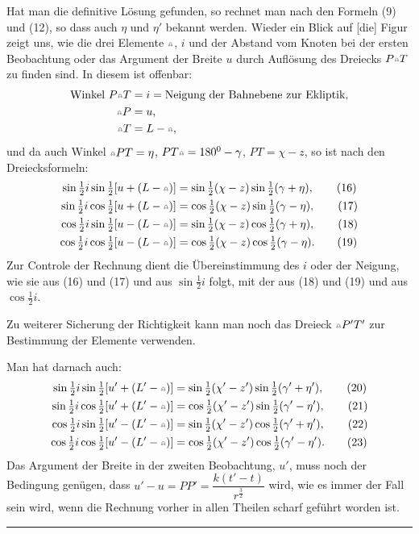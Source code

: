 Hat man die definitive Lösung gefunden, so rechnet man nach den Formeln (9) und (12), so dass auch $\eta$ und $\eta'$ bekannt werden. Wieder ein Blick auf [die] Figur zeigt uns, wie die drei Elemente $\AstNode$, $i$ und der Abstand vom Knoten bei der ersten Beobachtung oder das Argument der Breite $u$
\clearpage
{}
\noindent durch Auflösung des Dreiecks $P\AstNode T$ zu finden sind. In diesem ist offenbar:
\[
\begin{aligned}
\text{Winkel }P\AstNode T&=i=\text{Neigung der Bahnebene zur Ekliptik,}\\
\AstNode P&=u,\\
\AstNode T&=L-\AstNode,
\end{aligned}
\]
\noindent und da auch Winkel $\AstNode PT=\eta$, $PT\AstNode=180^0-\gamma$, $PT=\chi-z$, so ist nach den Dreiecksformeln:
\begin{align*}
\sin\tfrac12i\sin\tfrac12[u+(L-\AstNode)]&=\sin\tfrac12(\chi-z)\sin\tfrac12(\gamma+\eta),\tag*{(16)}\\
\sin\tfrac12i\cos\tfrac12[u+(L-\AstNode)]&=\cos\tfrac12(\chi-z)\sin\tfrac12(\gamma-\eta),\tag*{(17)}\\
\cos\tfrac12i\sin\tfrac12[u-(L-\AstNode)]&=\sin\tfrac12(\chi-z)\cos\tfrac12(\gamma+\eta),\tag*{(18)}\\
\cos\tfrac12i\cos\tfrac12[u-(L-\AstNode)]&=\cos\tfrac12(\chi-z)\cos\tfrac12(\gamma-\eta).\tag*{(19)}
\end{align*}
\noindent\hspace*{\parindent}Zur Controle der Rechnung dient die Übereinstimmung des $i$ oder der Neigung, wie sie aus (16) und (17) und aus $\sin\tfrac12i$ folgt, mit der aus (18) und (19) und aus $\cos\tfrac12i$.

Zu weiterer Sicherung der Richtigkeit kann man noch das Dreieck $\AstNode P'T'$ zur Bestimmung der Elemente verwenden.

Man hat darnach auch:
\begin{align*}
\sin\tfrac12i\sin\tfrac12[u'+(L'-\AstNode)]&=\sin\tfrac12(\chi'-z')\sin\tfrac12(\gamma'+\eta'),\tag*{(20)}\\
\sin\tfrac12i\cos\tfrac12[u'+(L'-\AstNode)]&=\cos\tfrac12(\chi'-z')\sin\tfrac12(\gamma'-\eta'),\tag*{(21)}\\
\cos\tfrac12i\sin\tfrac12[u'-(L'-\AstNode)]&=\sin\tfrac12(\chi'-z')\cos\tfrac12(\gamma'+\eta'),\tag*{(22)}\\
\cos\tfrac12i\cos\tfrac12[u'-(L'-\AstNode)]&=\cos\tfrac12(\chi'-z')\cos\tfrac12(\gamma'-\eta').\tag*{(23)}
\end{align*}
\noindent\hspace*{\parindent}Das Argument der Breite in der zweiten Beobachtung, $u'$, muss noch der Bedingung genügen, dass $u'-u=PP'=\dfrac{k(t'-t)}{r^{\frac32}}$ wird, wie es immer der Fall sein wird, wenn die Rechnung vorher in allen Theilen scharf geführt worden ist.
\begin{center}\rule{.24\linewidth}{.3pt}\end{center}
\clearpage
\endgroup

